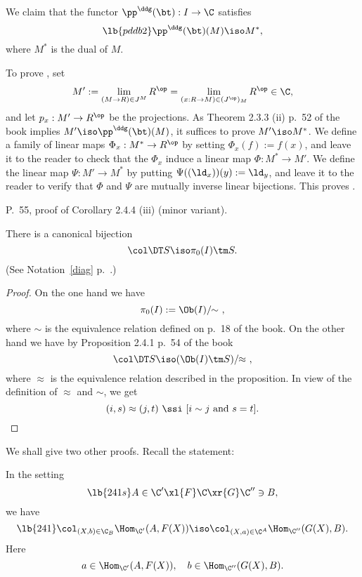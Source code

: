 \documentclass[12pt]{article}
\theoremstyle{remark}
\theoremstyle{definition}
\begin{document}
We claim that the functor $\pp^\ddg(\bt):I\to\C$ satisfies 
%
\begin{equation}\lb{pddb2}
\pp^\ddg(\bt)(M)\iso M^*, 
\end{equation} 
%
where $M^*$ is the dual of $M$. 

To prove , set 
$$
M':=\lim_{(M\to R)\in J^M}R^{\op}=\lim_{(x:R\to M)\in(J^{\op})_M}R^{\op}\in\C, 
$$ 
and let $p_x:M'\to R^{\op}$ be the projections. As Theorem 2.3.3 (ii) p.~52 of the book implies $M'\iso\pp^\ddg(\bt)(M)$, it suffices to prove $M'\iso M^*$. We define a family of linear maps $\Phi_x:M^*\to R^{\op}$ by setting $\Phi_x(f):=f(x)$, and leave it to the reader to check that the $\Phi_x$ induce a linear map $\Phi:M^*\to M'$. We define the linear map $\Psi:M'\to M^*$ by putting $\Psi((\ld_x))(y):=\ld_y$, and leave it to the reader to verify that $\Phi$ and $\Psi$ are mutually inverse linear bijections. This proves . 



\begin{s} 
P.~55, proof of Corollary 2.4.4 (iii) (minor variant).
%
\begin{prop}
There is a canonical bijection
$$
\col\DT S\iso\pi_0(I)\tm S.
$$ 
(See Notation~\ref{diag} p.~.)
\end{prop} 
%
\begin{proof}
On the one hand we have 
$$
\pi_0(I):=\Ob(I)/\!\!\sim\ , 
$$
where $\sim$ is the equivalence relation defined on p.~18 of the book. On the other hand we have by Proposition 2.4.1 p.~54 of the book 
$$
\col\DT S\iso(\Ob(I)\tm S)/\!\!\approx\ ,
$$
where $\approx$ is the equivalence relation described in the proposition. In view of the definition of $\approx$ and $\sim$, we get 
$$
(i,s)\approx(j,t)\ \ssi\ [i\sim j\text{ and }s=t].
$$ 
\end{proof}
\end{s}



We shall give two other proofs. Recall the statement: 

\begin{prop}[Corollary 2.4.6]
In the setting 
%
\begin{equation}\lb{241s}
A\in\C'\xl{F}\C\xr{G}\C''\ni B, 
\end{equation} 
%
we have 
%
\begin{equation}\lb{241} 
\col_{(X,b)\in\C_B}\Hom_{\C'}(A,F(X))\iso\col_{(X,a)\in\C^A}\Hom_{\C''}(G(X),B). 
\end{equation} 
%
Here 
$$
a\in\Hom_{\C'}(A,F(X)),\quad b\in\Hom_{\C''}(G(X),B). 
$$ 
\end{prop}
\end{document}
